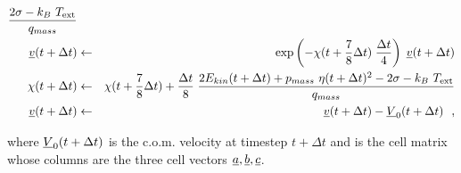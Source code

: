 \begin{enumerate}
\begin{eqnarray}
{{2 \sigma - k_{B}~T_{\rm ext}} \over q_{mass}} \nonumber \\
\mbox{$\underline{v}$}(t + \Delta t) &\leftarrow& \exp \left(-\chi (t + {7 \over 8} \Delta t) \;
{\Delta t \over 4} \right) \; \mbox{$\underline{v}$}(t + \Delta t) \\
\chi (t + \Delta t) &\leftarrow& \chi (t + {7 \over 8} \Delta t) +
{\Delta t \over 8} \; {{2 E_{kin}(t + \Delta t) + p_{mass}~\eta (t + \Delta t)^{2} -
2 \sigma - k_{B}~T_{\rm ext}} \over q_{mass}} \nonumber \\
\mbox{$\underline{v}$}(t + \Delta t) &\leftarrow& \mbox{$\underline{v}$}(t + \Delta t) - \mbox{$\underline{V}$}_{0}(t + \Delta t)~~, \nonumber
\end{eqnarray}
\end{enumerate}
where $\mbox{$\underline{V}$}_{0}(t + \Delta t)$ is the c.o.m.  velocity at timestep
$t + \Delta t$ and  is the cell matrix whose columns are the
three cell vectors $\mbox{$\underline{a}$}, \mbox{$\underline{b}$}, \mbox{$\underline{c}$}$.

